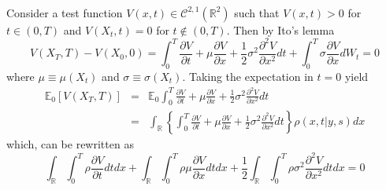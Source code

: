 \documentclass{article}
\begin{document}
\paragraph{} Consider a test function $V(x, t)\in\mathcal C^{2, 1}(\mathbb R^2)$ such that $V(x, t)> 0$ for$t\in (0, T)$ and $V(X_t, t) = 0$ for $t\notin (0, T)$. Then by Ito's lemma
%
\begin{equation}
V(X_T, T) - V(X_0, 0) = \int^T_0 \frac{\partial V}{\partial t} + \mu\frac{\partial V}{\partial x} + \frac{1}{2}\sigma^2\frac{\partial^2 V}{\partial x^2}dt + \int^T_0\sigma\frac{\partial V}{\partial x}dW_t = 0
\end{equation}
%
where $\mu\equiv\mu(X_t)$ and $\sigma\equiv\sigma(X_t)$. Taking the expectation in $t=0$ yield
%
\begin{eqnarray}
%
\mathbb E_0[V(X_T, T)] & = & \mathbb E_0 \int^T_0 \frac{\partial V}{\partial t} + \mu\frac{\partial V}{\partial x} + \frac{1}{2}\sigma^2\frac{\partial^2 V}{\partial x^2}dt\\
& = & \int_\mathbb R\left\{\int^T_0 \frac{\partial V}{\partial t} + \mu\frac{\partial V}{\partial x} + \frac{1}{2}\sigma^2\frac{\partial^2 V}{\partial x^2}dt\right\}\rho(x, t\vert y, s)dx
%
\end{eqnarray}
%
which,  can be rewritten as
%
\begin{equation}\label{fokker:part}
\int_\mathbb R\int^T_0 \rho\frac{\partial V}{\partial t}dtdx + \int_\mathbb R\int^T_0 \rho\mu\frac{\partial V}{\partial x}dtdx + \frac{1}{2}\int_\mathbb R\int^T_0 \rho\sigma^2\frac{\partial^2 V}{\partial x^2}dtdx = 0
\end{equation}
%
\end{document}
